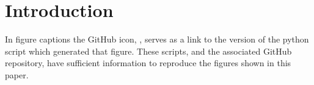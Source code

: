 \section{Introduction}
\label{sec:intro}





In figure captions the GitHub icon, , serves as a link to the version of the python script which generated that figure. These scripts, and the associated GitHub repository, have sufficient information to reproduce the figures shown in this paper.